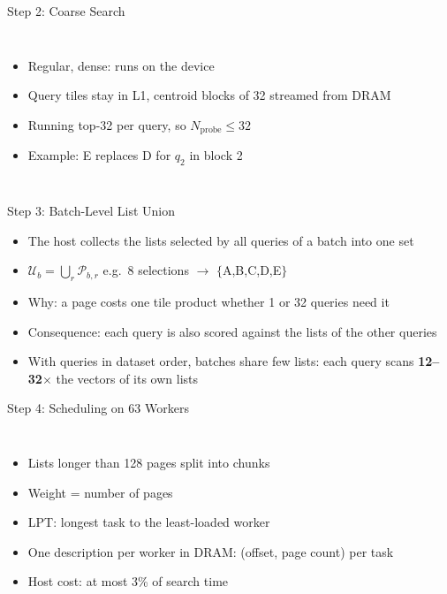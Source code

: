 \begin{frame}{Step 2: Coarse Search}
  \begin{columns}
    \begin{itemize}\footnotesize
      \item Regular, dense: runs on the device
      \item Query tiles stay in L1, centroid blocks of 32 streamed from DRAM
      \item Running top-32 per query, so $N_{\mathrm{probe}}\le32$
      \item Example: E replaces D for $q_2$ in block 2
    \end{itemize}
  \end{columns}
\end{frame}

\begin{frame}{Step 3: Batch-Level List Union}
  \begin{itemize}
    \item The host collects the lists selected by all queries of a batch into one set
    \item[] \centering $\mathcal{U}_b=\bigcup_{r} \mathcal{P}_{b,r}$ \quad e.g.\ 8 selections $\to$ $\{$A,B,C,D,E$\}$
    \item Why: a page costs one tile product whether 1 or 32 queries need it
    \item Consequence: each query is also scored against the lists of the other queries
    \item With queries in dataset order, batches share few lists: each query scans \textbf{12--32$\times$} the vectors of its own lists
  \end{itemize}
\end{frame}

\begin{frame}{Step 4: Scheduling on 63 Workers}
  \begin{columns}
    \begin{itemize}\footnotesize
      \item Lists longer than 128 pages split into chunks
      \item Weight = number of pages
      \item LPT: longest task to the least-loaded worker
      \item One description per worker in DRAM: (offset, page count) per task
      \item Host cost: at most 3\% of search time
    \end{itemize}
  \end{columns}
\end{frame}

